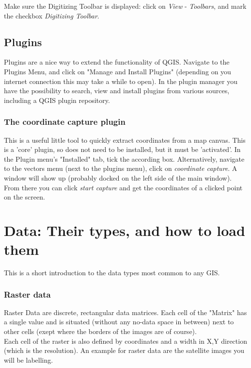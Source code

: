 \documentclass[12pt,a4paper]{scrartcl}
\begin{document}
Make sure the Digitizing Toolbar is displayed: click on \textit{View} - \textit{Toolbars}, and mark the checkbox \textit{Digitizing Toolbar}.

\subsection{Plugins}
Plugins are a nice way to extend the functionality of QGIS. Navigate to the Plugins Menu, and click on "Manage and Install Plugins" (depending on you internet connection this may take a while to open). In the plugin manager you have the possibility to search, view and install plugins from various sources, including a QGIS plugin repository. 

\subsubsection{The coordinate capture plugin}
\label{coordcap}
This is a useful little tool to quickly extract coordinates from a map canvas. This is a 'core' plugin, so does not need to be installed, but it must be 'activated'. In the Plugin menu's "Installed" tab, tick the according box. Alternatively, navigate to the vectors menu (next to the plugins menu), click on \textit{coordinate capture}. A window will show up (probably docked on the left side of the main window). From there you can click \textit{start capture} and get the coordinates of a clicked point on the screen.



\section{Data: Their types, and how to load them}
This is a short introduction to the data types most common to any GIS.

\subsubsection{Raster data}
\label{rastabands}
Raster Data are discrete, rectangular data matrices.
Each cell of the "Matrix" has a single value and is situated (without any no-data space in between) next to other cells (exept where the borders of the images are of course). \\
Each cell of the raster is also defined by coordinates and a width in X,Y direction (which is the resolution).
An example for raster data are the satellite images you will be labelling. \\
\end{document}
